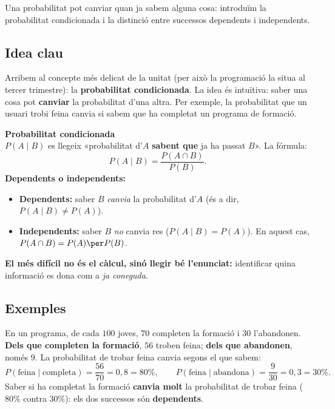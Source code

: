 %
{Una probabilitat pot canviar quan ja sabem alguna cosa: introduïm la probabilitat condicionada i la distinció entre successos dependents i independents.}

\subsection{Idea clau}

Arribem al concepte més delicat de la unitat (per això la programació la situa al
tercer trimestre): la \textbf{probabilitat condicionada}. La idea és intuïtiva: saber
una cosa pot \textbf{canviar} la probabilitat d'una altra. Per exemple, la probabilitat
que un usuari trobi feina canvia si sabem que ha completat un programa de formació.

\begin{idea}
\textbf{Probabilitat condicionada}\\
$P(A\mid B)$ es llegeix «probabilitat d'$A$ \textbf{sabent que} ja ha passat $B$». La
fórmula:
\[
P(A\mid B)=\frac{P(A\cap B)}{P(B)}.
\]
\textbf{Dependents o independents:}
\begin{itemize}[leftmargin=1.4em, itemsep=2pt]
  \item \textbf{Dependents:} saber $B$ \emph{canvia} la probabilitat d'$A$ (és a dir,
        $P(A\mid B)\neq P(A)$).
  \item \textbf{Independents:} saber $B$ \emph{no} canvia res ($P(A\mid B)=P(A)$). En
        aquest cas, $P(A\cap B)=P(A)\per P(B)$.
\end{itemize}
\textbf{El més difícil no és el càlcul, sinó llegir bé l'enunciat:} identificar quina
informació es dona com a \emph{ja coneguda}.
\end{idea}

\subsection{Exemples}

\begin{exemple}
En un programa, de cada $100$ joves, $70$ completen la formació i $30$ l'abandonen.
\textbf{Dels que completen la formació}, $56$ troben feina; \textbf{dels que
abandonen}, només $9$. La probabilitat de trobar feina canvia segons el que sabem:
\[
P(\text{feina}\mid\text{completa})=\frac{56}{70}=0,8=80\%,\qquad
P(\text{feina}\mid\text{abandona})=\frac{9}{30}=0,3=30\%.
\]
Saber si ha completat la formació \textbf{canvia molt} la probabilitat de trobar feina
($80\%$ contra $30\%$): els dos successos són \textbf{dependents}.
\end{exemple}

